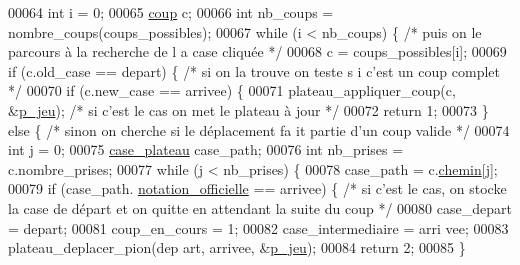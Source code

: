 \begin{DoxyCode}
00064                 \textcolor{keywordtype}{int} i = 0;
00065                 \hyperlink{structcoup}{coup} c;
00066                 \textcolor{keywordtype}{int} nb\_coups = nombre\_coups(coups\_possibles);
00067                 \textcolor{keywordflow}{while} (i < nb\_coups) \{ \textcolor{comment}{/* puis on le parcours à la recherche de l
      a case cliquée */}
00068                         c = coups\_possibles[i];
00069                         \textcolor{keywordflow}{if} (c.old\_case == depart) \{ \textcolor{comment}{/* si on la trouve on teste s
      i c'est un coup complet */}
00070                                 \textcolor{keywordflow}{if} (c.new\_case == arrivee) \{
00071                                         plateau\_appliquer\_coup(c, &\hyperlink{moteur_8h_a3efa8d0f7c65daedc584dc8db048e62c}{p_jeu}); \textcolor{comment}{/* si 
      c'est le cas on met le plateau à jour */}
00072                                         \textcolor{keywordflow}{return} 1;
00073                                 \} \textcolor{keywordflow}{else} \{ \textcolor{comment}{/* sinon on cherche si le déplacement fa
      it partie d'un coup valide */}
00074                                         \textcolor{keywordtype}{int} j = 0;
00075                                         \hyperlink{structcase__plateau}{case_plateau} case\_path;
00076                                         \textcolor{keywordtype}{int} nb\_prises = c.nombre\_prises;
00077                                         \textcolor{keywordflow}{while} (j < nb\_prises) \{
00078                                                 case\_path = c.\hyperlink{structcoup_aa66b88eb8140c2f459ac92fad0796510}{chemin}[j];
00079                                                 \textcolor{keywordflow}{if} (case\_path.
      \hyperlink{structcase__plateau_ad510581b324604a9cf685cbb769a421a}{notation_officielle} == arrivee) \{ \textcolor{comment}{/* si c'est le cas, on stocke la case de départ
       et on quitte en attendant la suite du coup */}
00080                                                         case\_depart = depart;
00081                                                         coup\_en\_cours = 1;
00082                                                         case\_intermediaire = arri
      vee;
00083                                                         plateau\_deplacer\_pion(dep
      art, arrivee, &\hyperlink{moteur_8h_a3efa8d0f7c65daedc584dc8db048e62c}{p_jeu});
00084                                                         \textcolor{keywordflow}{return} 2;
00085                                                 \}

\end{DoxyCode}
